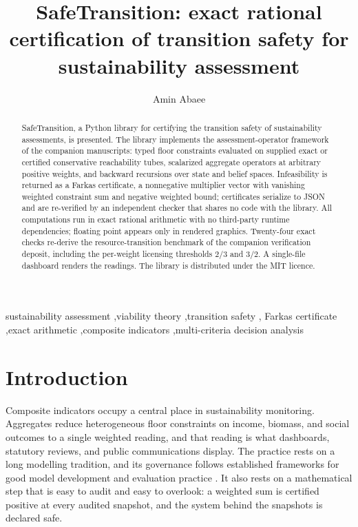 \documentclass[3p,11pt]{elsarticle}
\begin{document}
\begin{frontmatter}

\title{SafeTransition: exact rational certification of transition safety for
sustainability assessment}

\author[aff]{Amin Abaee}
\address[aff]{Independent Researcher,
\href{https://orcid.org/0000-0002-0019-1842}{ORCID: 0000-0002-0019-1842},
\href{mailto:amin\_abaee@ut.ac.ir}{amin\_abaee@ut.ac.ir}}

\begin{abstract}
SafeTransition, a Python library for certifying the transition safety of
sustainability assessments, is presented. The library implements the
assessment-operator framework of the companion manuscripts: typed floor
constraints evaluated on supplied exact or certified conservative
reachability tubes, scalarized aggregate operators at arbitrary positive
weights, and backward recursions over state and belief spaces. Infeasibility
is returned as a Farkas certificate, a nonnegative multiplier vector with
vanishing weighted constraint sum and negative weighted bound; certificates
serialize to JSON and are re-verified by an independent checker that shares
no code with the library. All computations run in exact rational arithmetic
with no third-party runtime dependencies; floating point appears only in
rendered graphics. Twenty-four exact checks re-derive the resource-transition
benchmark of the companion verification deposit, including the per-weight
licensing thresholds $2/3$ and $3/2$. A single-file dashboard renders the
readings. The library is distributed under the MIT licence.
\end{abstract}

\begin{keyword}
sustainability assessment \sep viability theory \sep transition safety \sep
Farkas certificate \sep exact arithmetic \sep composite indicators
\sep multi-criteria decision analysis
\end{keyword}

\end{frontmatter}

\section{Introduction}\label{sec:introduction}

Composite indicators occupy a central place in sustainability monitoring.
Aggregates reduce heterogeneous floor constraints on income, biomass, and
social outcomes to a single weighted reading, and that reading is what
dashboards, statutory reviews, and public communications display. The
practice rests on a long modelling tradition, and its governance follows
established frameworks for good model development and evaluation practice
\citep{Jakeman2006}. It also rests on a mathematical step that
is easy to audit and easy to overlook: a weighted sum is certified positive
at every audited snapshot, and the system behind the snapshots is declared
safe.
\end{document}
